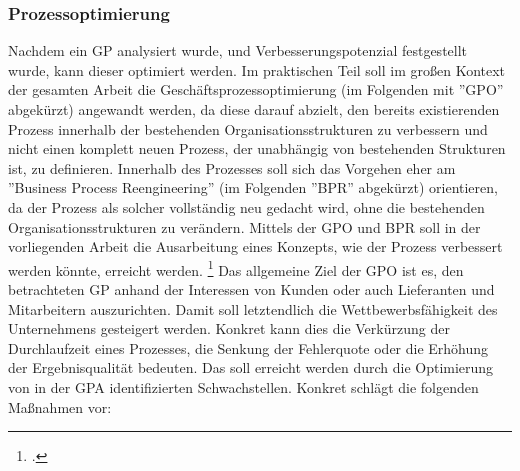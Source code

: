


\subsubsection{Prozessoptimierung}

Nachdem ein GP analysiert wurde, und Verbesserungspotenzial festgestellt wurde, kann dieser optimiert werden. Im praktischen Teil soll im gro\ss en Kontext der gesamten Arbeit die Geschäftsprozessoptimierung (im Folgenden mit ''GPO'' abgekürzt) angewandt werden, da diese darauf abzielt, den bereits existierenden Prozess innerhalb der bestehenden Organisationsstrukturen zu verbessern und nicht einen komplett neuen Prozess, der unabhängig von bestehenden Strukturen ist, zu definieren. Innerhalb des Prozesses soll sich das Vorgehen eher am ''Business Process Reengineering'' (im Folgenden ''BPR'' abgekürzt) orientieren, da der Prozess als solcher vollständig neu gedacht wird, ohne die bestehenden Organisationsstrukturen zu verändern.  Mittels der GPO und BPR soll in der vorliegenden Arbeit die Ausarbeitung eines Konzepts, wie der Prozess verbessert werden könnte, erreicht werden. \footcite[Vgl.][S. 31]{theorie_gadatsch_grundkurs_geschäftsprozessmanagement_2010} Das allgemeine Ziel der GPO ist es, den betrachteten GP anhand der Interessen von Kunden oder auch Lieferanten und Mitarbeitern auszurichten. Damit soll letztendlich die Wettbewerbsfähigkeit des Unternehmens gesteigert werden. Konkret kann dies die Verkürzung der Durchlaufzeit eines Prozesses, die Senkung der Fehlerquote oder die Erhöhung der Ergebnisqualität bedeuten. Das soll erreicht werden durch die Optimierung von in der GPA identifizierten Schwachstellen. Konkret schlägt \cite[][]{theorie_bleicher_organisation_1991} die folgenden Ma\ss nahmen vor:

